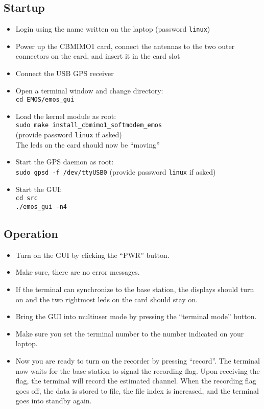 \documentclass[10pt,a4paper]{article}
\begin{document}
\subsection{Startup}
\begin{itemize}
\item Login using the name written on the laptop (password {\tt linux})
\item Power up the CBMIMO1 card, connect the antennas to the two outer connectors on the card, and insert it in the card slot
\item Connect the USB GPS receiver
\item Open a terminal window and change directory:\\
      {\tt cd EMOS/emos\_gui}
\item Load the kernel module as root:\\
      {\tt sudo make install\_cbmimo1\_softmodem\_emos}\\
      (provide password {\tt linux} if asked)\\
      The leds on the card should now be ``moving''
\item Start the GPS daemon as root:\\
      {\tt sudo gpsd -f /dev/ttyUSB0} (provide password {\tt linux} if asked)
\item Start the GUI:\\
      {\tt cd src}\\
      {\tt ./emos\_gui -n4}
\end{itemize}

\subsection{Operation}
\begin{itemize}

\item Turn on the GUI by clicking the ``PWR'' button. 

\item Make sure, there are no error messages.

\item If the terminal can synchronize to the base station, the displays should turn on and the two rightmost leds on the card should stay on. 

\item Bring the GUI into multiuser mode by pressing the ``terminal mode'' button. 

\item Make sure you set the terminal number to the number indicated on your laptop.

\item Now you are ready to turn on the recorder by pressing ``record''. The terminal now waits for the base station to signal the recording flag. Upon receiving the flag, the terminal will record the estimated channel. When the recording flag goes off, the data is stored to file, the file index is increased, and the terminal goes into standby again.
\end{itemize}
\end{document}
